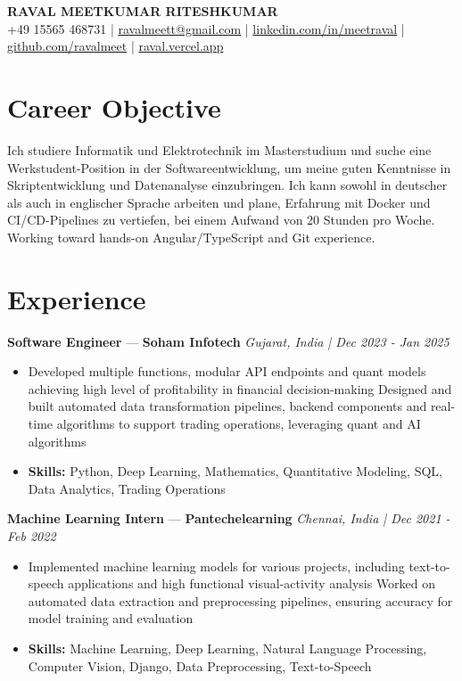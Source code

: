 \documentclass[a4paper,10pt]{article}
\begin{document}
\begin{center}
  {\Large\bfseries RAVAL MEETKUMAR RITESHKUMAR}\\[2pt]
  {\small +49 15565 468731 \;|\; \href{mailto:ravalmeett@gmail.com}{ravalmeett@gmail.com} \;|\; \href{https://www.linkedin.com/in/meetraval/}{linkedin.com/in/meetraval} \;|\; \href{https://github.com/ravalmeet}{github.com/ravalmeet} \;|\; \href{https://raval.vercel.app/}{raval.vercel.app}}
\end{center}
\vspace{-3pt}

\section*{Career Objective}
Ich studiere Informatik und Elektrotechnik im Masterstudium und suche eine Werkstudent-Position in der Softwareentwicklung, um meine guten Kenntnisse in Skriptentwicklung und Datenanalyse einzubringen. Ich kann sowohl in deutscher als auch in englischer Sprache arbeiten und plane, Erfahrung mit Docker und CI/CD-Pipelines zu vertiefen, bei einem Aufwand von 20 Stunden pro Woche. Working toward hands-on Angular/TypeScript and Git experience.\par

\section*{Experience}
\textbf{Software Engineer} — \textbf{Soham Infotech} \hfill \textit{Gujarat, India \;|\; Dec 2023 - Jan 2025}\par
\vspace{1pt}
\begin{itemize}
  \item Developed multiple functions, modular API endpoints and quant models achieving high level of profitability in financial decision-making Designed and built automated data transformation pipelines, backend components and real-time algorithms to support trading operations, leveraging quant and AI algorithms
  \item \textbf{Skills:} Python, Deep Learning, Mathematics, Quantitative Modeling, SQL, Data Analytics, Trading Operations
\end{itemize}
\vspace{3pt}
\textbf{Machine Learning Intern} — \textbf{Pantechelearning} \hfill \textit{Chennai, India \;|\; Dec 2021 - Feb 2022}\par
\vspace{1pt}
\begin{itemize}
  \item Implemented machine learning models for various projects, including text-to-speech applications and high functional visual-activity analysis Worked on automated data extraction and preprocessing pipelines, ensuring accuracy for model training and evaluation
  \item \textbf{Skills:} Machine Learning, Deep Learning, Natural Language Processing, Computer Vision, Django, Data Preprocessing, Text-to-Speech
\end{itemize}
\end{document}
